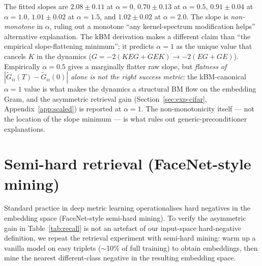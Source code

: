 \documentclass{article}
\newcommand{\Gtilde}{\widetilde{G}}
\begin{document}
The fitted slopes are
$2.08 \pm 0.11$ at $\alpha=0$,
$0.70 \pm 0.13$ at $\alpha=0.5$,
$0.91 \pm 0.04$ at $\alpha=1.0$,
$1.01 \pm 0.02$ at $\alpha=1.5$, and
$1.02 \pm 0.02$ at $\alpha=2.0$. The slope is \emph{non-monotone} in
$\alpha$, ruling out a monotone ``any kernel-spectrum modification
helps'' alternative explanation. The kBM derivation makes a different
claim than ``the empirical slope-flattening minimum''; it predicts
$\alpha\!=\!1$ as the unique value that cancels $K$ in the dynamics
($\dot G = -2(KEG + GEK) \to -2(EG + GE)$). Empirically $\alpha\!=\!0.5$
gives a marginally flatter raw slope, but
\emph{flatness of $|\Gtilde_{ii}(T)-\Gtilde_{ii}(0)|$ alone is not the
right success metric}: the kBM-canonical $\alpha\!=\!1$ value is what
makes the dynamics a structural BM flow on the embedding Gram, and
the asymmetric retrieval gain (Section~\ref{sec:exp-cifar},
Appendix~\ref{app:scaled}) is reported at $\alpha\!=\!1$. The
non-monotonicity itself --- not the location of the slope minimum
--- is what rules out generic-preconditioner explanations.

\section{Semi-hard retrieval (FaceNet-style mining)}
\label{app:semihard}

Standard practice in deep metric learning operationalises hard
negatives in the embedding space (FaceNet-style semi-hard mining). To
verify the asymmetric gain in Table~\ref{tab:recall} is not an artefact
of our input-space hard-negative definition, we repeat the retrieval
experiment with semi-hard mining: warm up a vanilla model on easy
triplets ($\sim$10\% of full training) to obtain embeddings, then mine
the nearest different-class negative in the resulting embedding space.
\end{document}
